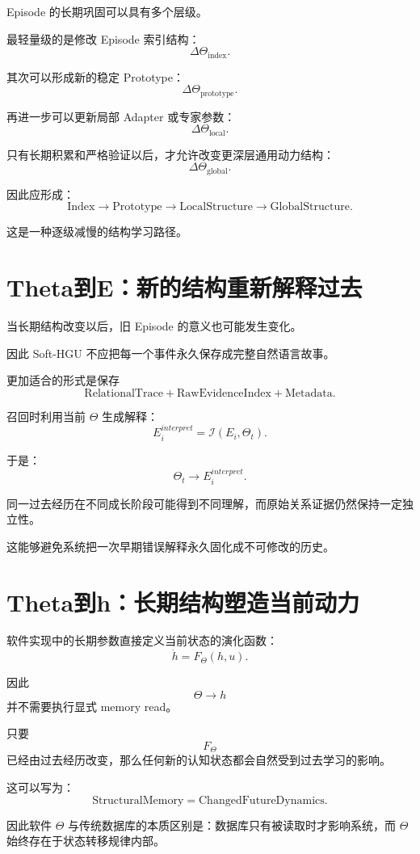 Episode 的长期巩固可以具有多个层级。

最轻量级的是修改 Episode 索引结构：
\[
\Delta\Theta_{\mathrm{index}}.
\]

其次可以形成新的稳定 Prototype：
\[
\Delta\Theta_{\mathrm{prototype}}.
\]

再进一步可以更新局部 Adapter 或专家参数：
\[
\Delta\Theta_{\mathrm{local}}.
\]

只有长期积累和严格验证以后，才允许改变更深层通用动力结构：
\[
\Delta\Theta_{\mathrm{global}}.
\]

因此应形成：
\[
\boxed{
\mathrm{Index}
\rightarrow
\mathrm{Prototype}
\rightarrow
\mathrm{LocalStructure}
\rightarrow
\mathrm{GlobalStructure}.
}
\]

这是一种逐级减慢的结构学习路径。

\section{Theta到E：新的结构重新解释过去}

当长期结构改变以后，旧 Episode 的意义也可能发生变化。

因此 Soft-HGU 不应把每一个事件永久保存成完整自然语言故事。

更加适合的形式是保存
\[
\boxed{
\mathrm{RelationalTrace}
+
\mathrm{RawEvidenceIndex}
+
\mathrm{Metadata}.
}
\]

召回时利用当前 $\Theta$ 生成解释：
\[
E_i^{interpret}
=
\mathcal I(E_i,\Theta_t).
\]

于是：
\[
\boxed{
\Theta_t
\rightarrow
E_i^{interpret}.
}
\]

同一过去经历在不同成长阶段可能得到不同理解，而原始关系证据仍然保持一定独立性。

这能够避免系统把一次早期错误解释永久固化成不可修改的历史。

\section{Theta到h：长期结构塑造当前动力}

软件实现中的长期参数直接定义当前状态的演化函数：
\[
\dot h
=
F_\Theta(h,u).
\]

因此
\[
\Theta\rightarrow h
\]
并不需要执行显式 memory read。

只要
\[
F_\Theta
\]
已经由过去经历改变，那么任何新的认知状态都会自然受到过去学习的影响。

这可以写为：
\[
\boxed{
\mathrm{StructuralMemory}
=
\mathrm{ChangedFutureDynamics}.
}
\]

因此软件 $\Theta$ 与传统数据库的本质区别是：数据库只有被读取时才影响系统，而 $\Theta$ 始终存在于状态转移规律内部。

